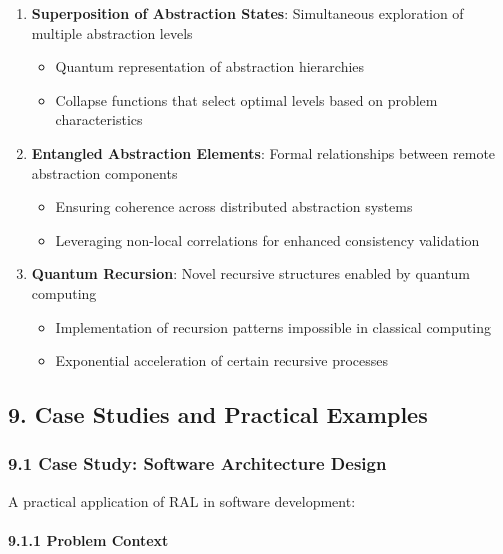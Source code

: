 \documentclass[
]{article}
\providecommand{\tightlist}{%
  \setlength{\itemsep}{0pt}\setlength{\parskip}{0pt}}
\begin{document}
\begin{enumerate}
\def\labelenumi{\arabic{enumi}.}
\tightlist
\item
  \textbf{Superposition of Abstraction States}: Simultaneous exploration
  of multiple abstraction levels

  \begin{itemize}
  \tightlist
  \item
    Quantum representation of abstraction hierarchies
  \item
    Collapse functions that select optimal levels based on problem
    characteristics
  \end{itemize}
\item
  \textbf{Entangled Abstraction Elements}: Formal relationships between
  remote abstraction components

  \begin{itemize}
  \tightlist
  \item
    Ensuring coherence across distributed abstraction systems
  \item
    Leveraging non-local correlations for enhanced consistency
    validation
  \end{itemize}
\item
  \textbf{Quantum Recursion}: Novel recursive structures enabled by
  quantum computing

  \begin{itemize}
  \tightlist
  \item
    Implementation of recursion patterns impossible in classical
    computing
  \item
    Exponential acceleration of certain recursive processes
  \end{itemize}
\end{enumerate}

\subsection{9. Case Studies and Practical
Examples}\label{case-studies-and-practical-examples}

\subsubsection{9.1 Case Study: Software Architecture
Design}\label{case-study-software-architecture-design}

A practical application of RAL in software development:

\paragraph{9.1.1 Problem Context}\label{problem-context}
\end{document}
